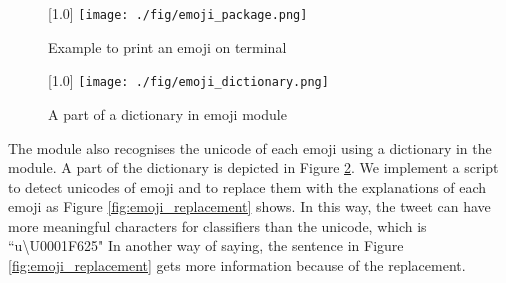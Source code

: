 \begin{figure}
	\centering
	\scalebox{1.0}[1.0]{
	\texttt{[image: ./fig/emoji\_package.png]}
	}
	\caption{Example to print an emoji on terminal}
	\label{fig:thumbs_up}
\end{figure}


\begin{figure}
	\centering
	\scalebox{1.0}[1.0]{
	\texttt{[image: ./fig/emoji\_dictionary.png]}
	}
	\caption{A part of a dictionary in emoji module}
	\label{fig:emoji_dict}
\end{figure}

The module also recognises the unicode of each emoji using a dictionary in the module.
A part of the dictionary is depicted in Figure \ref{fig:emoji_dict}.
We implement a script to detect unicodes of emoji and to replace them with the explanations of each emoji as Figure \ref{fig:emoji_replacement} shows.
In this way, the tweet can have more meaningful characters for classifiers than the unicode, which is ``u\textbackslash U0001F625"
In another way of saying, the sentence in Figure \ref{fig:emoji_replacement} gets more information because of the replacement.

